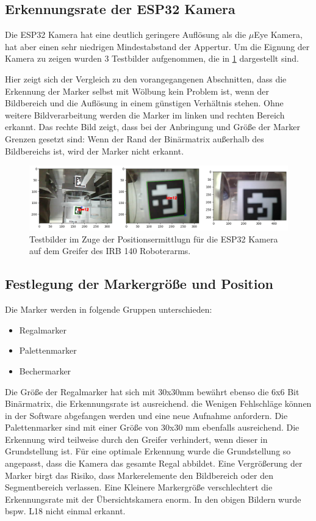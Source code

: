     \subsection{Erkennungsrate der ESP32 Kamera}\label{ErkennungsrateESP32}

    Die ESP32 Kamera hat eine deutlich geringere Auflösung als die $\mu$Eye Kamera, hat aber einen sehr niedrigen Mindestabstand der Appertur.
    Um die Eignung der Kamera zu zeigen wurden 3 Testbilder aufgenommen, die in \ref{fig:figure27} dargestellt sind.

    Hier zeigt sich der Vergleich zu den vorangegangenen Abschnitten, dass die Erkennung der Marker selbst mit Wölbung kein Problem ist, wenn der Bildbereich und die Auflösung in einem günstigen Verhältnis stehen.
    Ohne weitere Bildverarbeitung werden die Marker im linken und rechten Bereich erkannt. 
    Das rechte Bild zeigt, dass bei der Anbringung und Größe der Marker Grenzen gesetzt sind: 
    Wenn der Rand der Binärmatrix außerhalb des Bildbereichs ist, wird der Marker nicht erkannt.

    \begin{figure}
        \caption[Testbilder mit ESP 32 WebCam]{Testbilder im Zuge der Positionsermittlugn für die ESP32 Kamera auf dem Greifer des IRB 140 Roboterarms.}\label{fig:figure27}
        \includegraphics[width = \textwidth]{Bilder/ESP32CamTest.png}
        \centering
    \end{figure}

    \subsection{Festlegung der Markergröße und Position}

    Die Marker werden in folgende Gruppen unterschieden:
    \begin{itemize}
        \item Regalmarker
        \item Palettenmarker
        \item Bechermarker
    \end{itemize}
    Die Größe der Regalmarker hat sich mit 30x30mm bewährt ebenso die 6x6 Bit Binärmatrix, die Erkennungsrate ist ausreichend. die Wenigen Fehlschläge können in der Software abgefangen werden und eine neue Aufnahme anfordern.
    Die Palettenmarker sind mit einer Größe von 30x30 mm ebenfalls ausreichend. 
    Die Erkennung wird teilweise durch den Greifer verhindert, wenn dieser in Grundstellung ist. 
    Für eine optimale Erkennung wurde die Grundstellung so angepasst, dass die Kamera das gesamte Regal abbildet.
    Eine Vergrößerung der Marker birgt das Risiko, dass Markerelemente den Bildbereich oder den Segmentbereich verlassen. 
    Eine Kleinere Markergröße verschlechtert die Erkennungsrate mit der Übersichtskamera enorm. 
    In den obigen Bildern wurde bspw. L18 nicht einmal erkannt.
    
